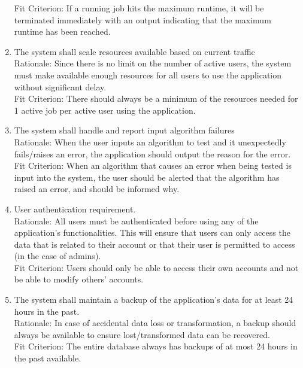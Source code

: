 \documentclass{article}
\begin{document}
\begin{enumerate}[label=\textbf{SR-\arabic*:}]{\leftmargin=1em \itemindent=0em}
    \newline Fit Criterion: If a running job hits the maximum runtime, it will be terminated immediately with an output indicating that the maximum runtime has been reached.
    \item The system shall scale resources available based on current traffic \\
    \newline Rationale: Since there is no limit on the number of active users, the system must make available enough resources for all users to use the application without significant delay. \\
    \newline Fit Criterion: There should always be a minimum of the resources needed for 1 active job per active user using the application.
    \item The system shall handle and report input algorithm failures \\
    \newline Rationale: When the user inputs an algorithm to test and it unexpectedly fails/raises an error, the application should output the reason for the error. \\
    \newline Fit Criterion: When an algorithm that causes an error when being tested is input into the system, the user should be alerted that the algorithm has raised an error, and should be informed why.
    \item User authentication requirement. \\
    \newline Rationale: All users must be authenticated before using any of the application’s functionalities. This will ensure that users can only access the data that is related to their account or that their user is permitted to access (in the case of admins). \\
    \newline Fit Criterion: Users should only be able to access their own accounts and not be able to modify others’ accounts.
    \item The system shall maintain a backup of the application’s data for at least 24 hours in the past. \\
    \newline Rationale: In case of accidental data loss or transformation, a backup should always be available to ensure lost/transformed data can be recovered. \\
    \newline Fit Criterion: The entire database always has backups of at most 24 hours in the past available.
\end{enumerate}
\end{document}
